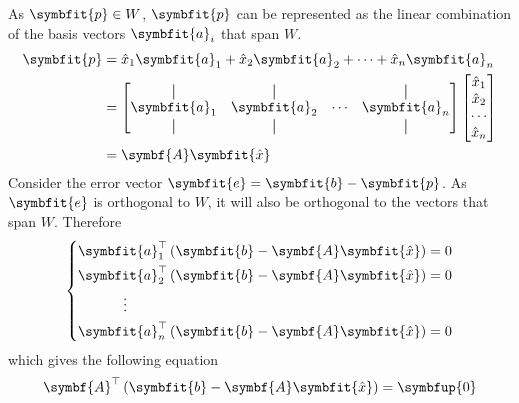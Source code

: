 \documentclass{article}
\begin{document}
\begin{solution}[Proof]
    As \(\symbfit{p}\in W\), \(\symbfit{p}\) can be represented as the
    linear combination of the basis vectors \(\symbfit{a}_i\) that span
    \(W\).
    \begin{align*}
        \symbfit{p} & = \hat{x}_1 \symbfit{a}_1 + \hat{x}_2 \symbfit{a}_2 + \cdots + \hat{x}_n \symbfit{a}_n \\
                    & =
        \begin{bmatrix}
            \vertbar      & \vertbar      &        & \vertbar      \\
            \symbfit{a}_1 & \symbfit{a}_2 & \cdots & \symbfit{a}_n \\
            \vertbar      & \vertbar      &        & \vertbar
        \end{bmatrix}
        \begin{bmatrix}
            \hat{x}_1 \\
            \hat{x}_2 \\
            \cdots    \\
            \hat{x}_n
        \end{bmatrix}                                                                                       \\
                    & = \symbf{A}\symbfit{\hat{x}}
    \end{align*}
    Consider the error vector \(\symbfit{e}=\symbfit{b}-\symbfit{p}\).
    As \(\symbfit{e}\) is orthogonal to \(W\), it will also be
    orthogonal to the vectors that span \(W\). Therefore
    \begin{equation*}
        \left\{
        \begin{aligned}
            \symbfit{a}_1^\top\left( \symbfit{b}-\symbf{A}\symbfit{\hat{x}} \right)                         & = 0 \\
            \symbfit{a}_2^\top\left( \symbfit{b}-\symbf{A}\symbfit{\hat{x}} \right)                         & = 0 \\
            \vdotswithin{\symbfit{a}_3^\top}\phantom{\left( \symbfit{b}-\symbf{A}\symbfit{\hat{x}} \right)} &     \\
            \symbfit{a}_n^\top\left( \symbfit{b}-\symbf{A}\symbfit{\hat{x}} \right)                         & = 0
        \end{aligned}
        \right.
    \end{equation*}
    which gives the following equation
    \begin{equation*}
        \symbf{A}^\top \left( \symbfit{b}-\symbf{A}\symbfit{\hat{x}} \right) = \symbfup{0}

\end{equation*}
\end{solution}
\end{document}
